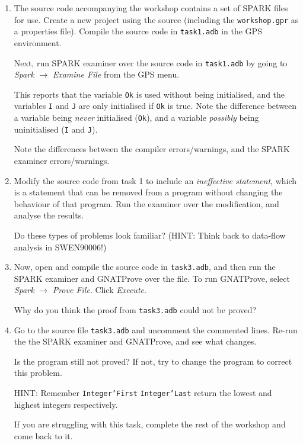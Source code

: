\documentclass{article}
\begin{document}
\begin{enumerate}

 \item The source code accompanying the workshop contains a set of SPARK files for use. Create a new project using the source (including the \texttt{workshop.gpr} as a properties file).  Compile the source code in {\tt task1.adb} in the GPS environment.

 Next, run SPARK examiner over the source code in {\tt task1.adb} by going to \emph{Spark} $\rightarrow$ \emph{Examine File} from the GPS menu.

  This reports that the variable {\tt Ok} is used without being initialised, and the   variables {\tt I} and {\tt J} are only initialised if {\tt Ok} is   true. Note the difference between a variable being {\em never} initialised (\texttt{Ok}), and a variable {\em possibly} being uninitialised (\texttt{I} and \texttt{J}).

  Note the differences between the compiler errors/warnings, and the SPARK examiner errors/warnings.

 \item Modify the source code from task 1 to include an {\em    ineffective statement}, which is a statement that can be removed    from a program without changing the behaviour of that program. Run the examiner over the modification, and analyse the results.

  Do these types of problems look familiar? (HINT: Think back to data-flow analysis in SWEN90006!)

 \item Now, open and compile the source code in {\tt task3.adb}, and then run the SPARK examiner and GNATProve over the file. To run GNATProve, select  \emph{Spark} $\rightarrow$ \emph{Prove File}. Click \emph{Execute}.

 Why do you think the proof from \texttt{task3.adb} could not be proved?

  \item Go to the source file {\tt task3.adb} and uncomment the commented lines. Re-run the the SPARK examiner and GNATProve, and see what changes.

 Is the program still not proved? If not, try to change the program to correct this problem. 

HINT: Remember \texttt{Integer'First} \texttt{Integer'Last} return the lowest and highest integers respectively.

 If you are struggling with this task, complete the rest of the workshop and come back to it.



\end{enumerate}
\end{document}
